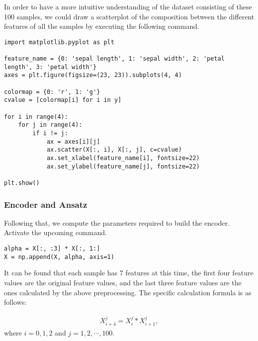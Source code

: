 In order to have a more intuitive understanding of the dataset consisting of these 100 samples, we could draw a scatterplot of the composition between the different features of all the samples by executing the following command.

\begin{lstlisting}
import matplotlib.pyplot as plt

feature_name = {0: 'sepal length', 1: 'sepal width', 2: 'petal length', 3: 'petal width'}
axes = plt.figure(figsize=(23, 23)).subplots(4, 4)

colormap = {0: 'r', 1: 'g'}
cvalue = [colormap[i] for i in y]

for i in range(4):
    for j in range(4):
        if i != j:
            ax = axes[i][j]
            ax.scatter(X[:, i], X[:, j], c=cvalue)
            ax.set_xlabel(feature_name[i], fontsize=22)
            ax.set_ylabel(feature_name[j], fontsize=22)

plt.show()
\end{lstlisting}



\subsubsection{Encoder and Ansatz}
Following that, we compute the parameters required to build the encoder.  Activate the upcoming command.

\begin{lstlisting}
alpha = X[:, :3] * X[:, 1:]
X = np.append(X, alpha, axis=1)
\end{lstlisting}

It can be found that each sample has 7 features at this time, the first four feature values are the original feature values, and the last three feature values are the ones calculated by the above preprocessing. The specific calculation formula is as follows:

\begin{eqnarray}\label{5.1dataprocessing}
    X_{i+4}^{j} = X_{i}^{j} * X_{i+1}^{j},
\end{eqnarray}
where $i = 0, 1, 2$ and $j = 1, 2, \cdots, 100$.


